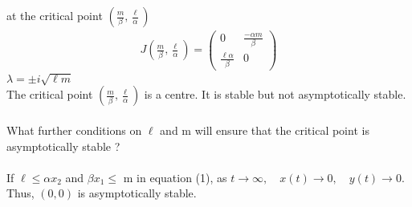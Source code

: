 \documentclass[a4paper, 12pt]{article}
\begin{document}
at the critical point $(\frac{m}{\beta}, \frac{\ell}{\alpha}) $
\begin{align*}
J(\frac{m}{\beta}, \frac{\ell}{\alpha}) =
\begin{pmatrix}
0 & \frac{-\alpha m}{\beta}\\
\frac{\ell \alpha}{\beta} & 0 
\end{pmatrix}
\end{align*}
$\lambda = \pm i \sqrt{\ell m} $ \\
The critical point $(\frac{m}{\beta}, \frac{\ell}{\alpha}) $ is a centre. It is stable but not asymptotically stable.\\~\\
What further conditions on $\ell$ and m will ensure that the critical point is asymptotically stable ? \\~\\
If $\ell \le \alpha x_{2} $ and $\beta x_{1} \le$ m in equation (1), as $t \rightarrow \infty, \quad x(t) \rightarrow 0, \quad y(t) \rightarrow 0 $. Thus, $(0,0)$ is asymptotically stable.
\end{document}
